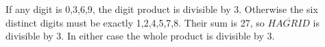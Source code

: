 If any digit is 0,3,6,9, the digit product is divisible by 3. Otherwise the six distinct digits must be exactly 1,2,4,5,7,8. Their sum is 27, so $\overline{HAGRID}$ is divisible by 3. In either case the whole product is divisible by 3.
